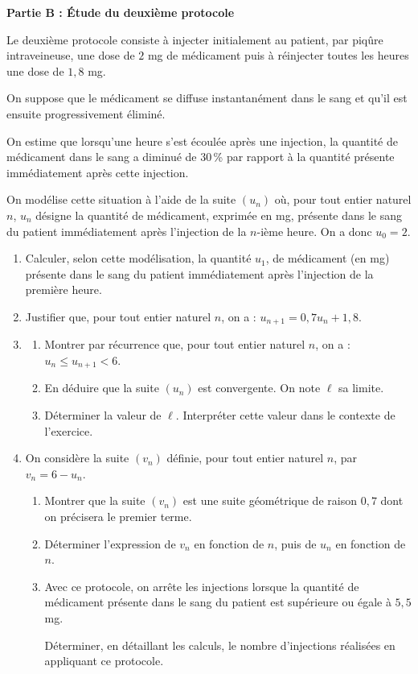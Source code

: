 \bigskip

\textbf{Partie B : Étude du deuxième protocole}

\medskip

Le deuxième protocole consiste à injecter initialement au patient, par piqûre intraveineuse, une dose de $2$ mg de médicament puis à réinjecter toutes les heures une dose de $1,8$ mg.

On suppose que le médicament se diffuse instantanément dans le sang et qu'il est ensuite
progressivement éliminé.

On estime que lorsqu'une heure s'est écoulée après une injection, la quantité de médicament dans le sang a diminué de 30\,\% par rapport à la quantité présente immédiatement après cette injection.

On modélise cette situation à l'aide de la suite $\left(u_n\right)$ où, pour tout entier naturel $n$, $u_n$ désigne la quantité de médicament, exprimée en mg, présente dans le sang du patient immédiatement après l'injection de la $n$-ième heure. On a donc $u_0 = 2$.

\medskip

\begin{enumerate}
\item Calculer, selon cette modélisation, la quantité $u_1$, de médicament (en mg) présente dans le sang du patient immédiatement après l'injection de la première heure.
\item Justifier que, pour tout entier naturel $n$, on a : $u_{n+1} = 0,7u_n + 1,8$.
\item 
	\begin{enumerate}
		\item Montrer par récurrence que, pour tout entier naturel $n$, on a : $u_n \leqslant u_{n+1}  < 6$.
		\item En déduire que la suite $\left(u_n\right)$ est convergente. On note $\ell$ sa limite.
		\item Déterminer la valeur de $\ell$. Interpréter cette valeur dans le contexte de l'exercice.
	\end{enumerate}	
\item On considère la suite $\left(v_n\right)$ définie, pour tout entier naturel $n$, par $v_n = 6 - u_n$.
	\begin{enumerate}
		\item Montrer que la suite $\left(v_n\right)$ est une suite géométrique de raison $0,7$ dont on précisera le premier terme.
		\item Déterminer l'expression de $v_n$ en fonction de $n$, puis de $u_n$ en fonction de $n$.
		\item Avec ce protocole, on arrête les injections lorsque la quantité de médicament présente dans le sang du patient est supérieure ou égale à $5,5$ mg.

Déterminer, en détaillant les calculs, le nombre d'injections réalisées en appliquant ce protocole.
	\end{enumerate}
\end{enumerate}

\bigskip
